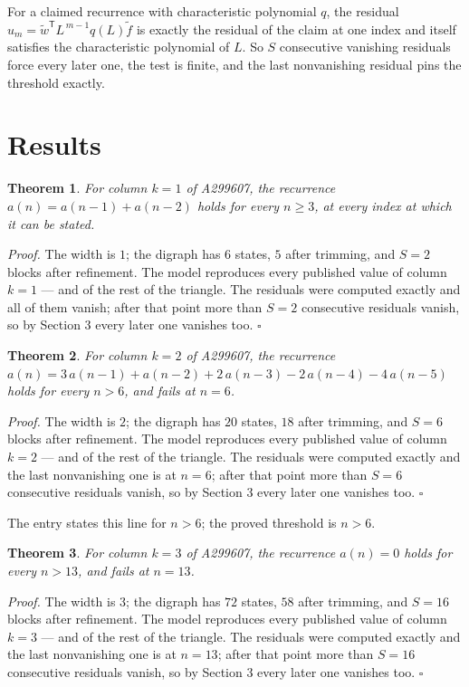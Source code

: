 \documentclass[11pt]{article}
\newtheorem{theorem}{Theorem}
\theoremstyle{definition}
\begin{document}
For a claimed recurrence with characteristic polynomial $q$, the residual $u_m = \tilde w^{\mathsf T}L^{\,m-1}q(L)\tilde f$ is exactly the residual of the claim at one index and itself satisfies the characteristic polynomial of $L$. So $S$ consecutive vanishing residuals force every later one, the test is finite, and the last nonvanishing residual pins the threshold exactly.

\section{Results}

\begin{theorem} For column $k = 1$ of A299607, the recurrence $a(n) = a(n-1) + a(n-2)$ holds for every $n \ge 3$, at every index at which it can be stated.\end{theorem}

{\itshape Proof.} The width is $1$; the digraph has $6$ states, $5$ after trimming, and $S = 2$ blocks after refinement. The model reproduces every published value of column $k = 1$ --- and of the rest of the triangle. The residuals were computed exactly and all of them vanish; after that point more than $S = 2$ consecutive residuals vanish, so by Section 3 every later one vanishes too. $\square$

\begin{theorem} For column $k = 2$ of A299607, the recurrence $a(n) = 3\,a(n-1) + a(n-2) + 2\,a(n-3) - 2\,a(n-4) - 4\,a(n-5)$ holds for every $n > 6$, and fails at $n = 6$.\end{theorem}

{\itshape Proof.} The width is $2$; the digraph has $20$ states, $18$ after trimming, and $S = 6$ blocks after refinement. The model reproduces every published value of column $k = 2$ --- and of the rest of the triangle. The residuals were computed exactly and the last nonvanishing one is at $n = 6$; after that point more than $S = 6$ consecutive residuals vanish, so by Section 3 every later one vanishes too. $\square$

The entry states this line for $n > 6$; the proved threshold is $n > 6$.

\begin{theorem} For column $k = 3$ of A299607, the recurrence $a(n) = 0$ holds for every $n > 13$, and fails at $n = 13$.\end{theorem}

{\itshape Proof.} The width is $3$; the digraph has $72$ states, $58$ after trimming, and $S = 16$ blocks after refinement. The model reproduces every published value of column $k = 3$ --- and of the rest of the triangle. The residuals were computed exactly and the last nonvanishing one is at $n = 13$; after that point more than $S = 16$ consecutive residuals vanish, so by Section 3 every later one vanishes too. $\square$
\end{document}
